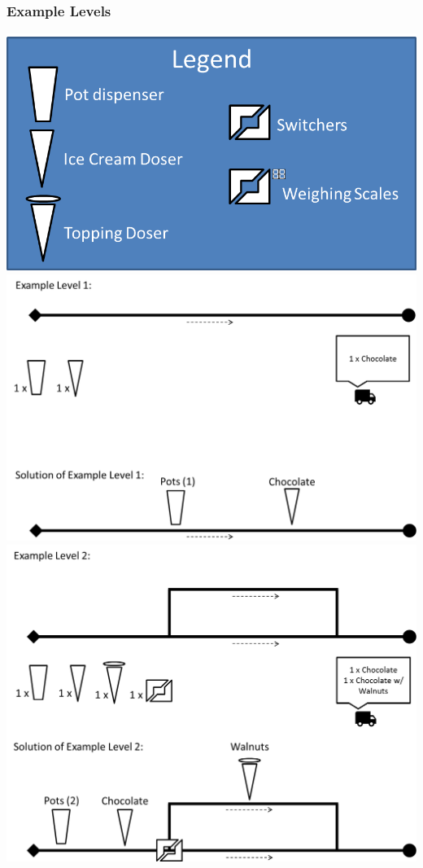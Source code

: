 \documentclass[a4paper]{scrartcl}
\begin{document}
	\subsubsection{Example Levels}
		\includegraphics[width=\textwidth]{levels/legend}
		\includegraphics[width=\textwidth]{levels/01}
		\includegraphics[width=\textwidth]{levels/02}
\end{document}
